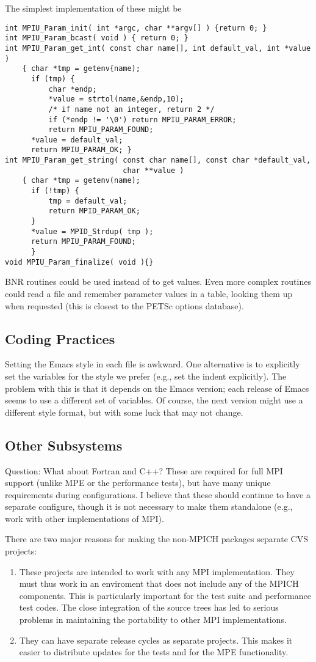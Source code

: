 \documentclass{article}
\begin{document}
The simplest implementation of these might be
\begin{verbatim}
int MPIU_Param_init( int *argc, char **argv[] ) {return 0; }
int MPIU_Param_bcast( void ) { return 0; }
int MPIU_Param_get_int( const char name[], int default_val, int *value ) 
    { char *tmp = getenv{name); 
      if (tmp) { 
          char *endp;
          *value = strtol(name,&endp,10); 
          /* if name not an integer, return 2 */
          if (*endp != '\0') return MPIU_PARAM_ERROR;
          return MPIU_PARAM_FOUND;
      *value = default_val; 
      return MPIU_PARAM_OK; }
int MPIU_Param_get_string( const char name[], const char *default_val,
                           char **value ) 
    { char *tmp = getenv(name); 
      if (!tmp) {
          tmp = default_val; 
          return MPID_PARAM_OK;
      }
      *value = MPID_Strdup( tmp );
      return MPIU_PARAM_FOUND;
      }
void MPIU_Param_finalize( void ){}
\end{verbatim}
BNR routines could be
used instead of  to get values.  Even more complex
routines could read a  file and remember parameter
values in a table, looking them up when requested (this is closest to
the PETSc options database).

\subsection{Coding Practices}
Setting the Emacs style in each file is awkward.
One alternative is to explicitly set the variables for the style we prefer
(e.g., set the indent explicitly).  The problem with this is that it depends
on the Emacs version; each release of Emacs seems to use a different set of
variables.  Of course, the next version might use a different style format,
but with some luck that may not change.


\subsection{Other Subsystems}
Question: What about Fortran and C++?  These are required for full MPI support
(unlike MPE or the performance tests), but have many unique requirements
during configurations.  I believe that these should continue to have a
separate configure, though it is not necessary to make them standalone (e.g.,
work with other implementations of MPI).

There are two major reasons for making the non-MPICH packages separate CVS
projects:
\begin{enumerate}
\item These projects are intended to work with any MPI implementation.  They
  must thus work in an enviroment that does not include any of the MPICH
  components.  This is particularly important for the test suite and
  performance test codes.  The close integration of the source trees has led
  to serious problems in maintaining the portability to other MPI
  implementations.  
\item They can have separate release cycles as separate projects.  This makes
  it easier to distribute updates for the tests and for the MPE functionality.
\end{enumerate}
\end{document}
